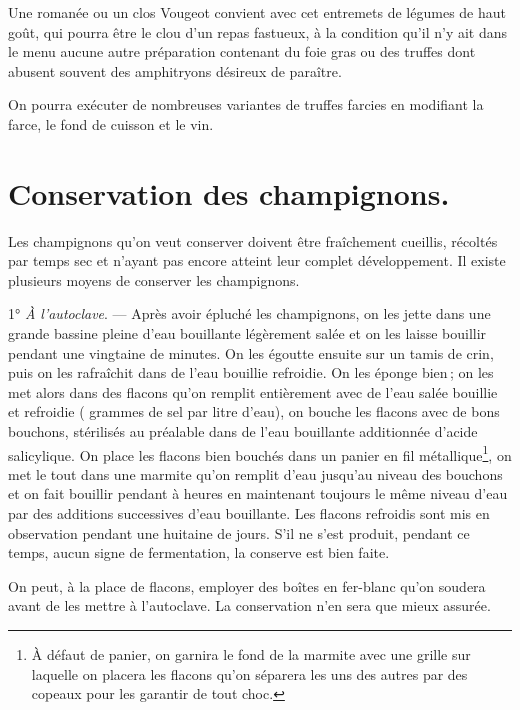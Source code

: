 Une romanée ou un clos Vougeot convient avec cet entremets de légumes de
haut goût, qui pourra être le clou d'un repas fastueux, à la condition qu'il n'y
ait dans le menu aucune autre préparation contenant du foie gras ou des truffes
dont abusent souvent des amphitryons désireux de paraître.

\sk

On pourra exécuter de nombreuses variantes de truffes farcies en modifiant la
farce, le fond de cuisson et le vin.

\section*{\centering Conservation des champignons.}
{}

Les champignons qu'on veut conserver doivent être fraîchement cueillis, récoltés
par temps sec et n'ayant pas encore atteint leur complet développement.
Il existe plusieurs moyens de conserver les champignons.

\medskip

1° \textit{À l'autoclave}. — Après avoir épluché les champignons, on les jette
dans une grande bassine pleine d'eau bouillante légèrement salée et on les
laisse bouillir pendant une vingtaine de minutes. On les égoutte ensuite sur un
tamis de crin, puis on les rafraîchit dans de l’eau bouillie refroidie. On les
éponge bien ; on les met alors dans des flacons qu'on remplit entièrement avec
de l'eau salée bouillie et refroidie ({\mmm} grammes de sel par litre
d'eau), on bouche les flacons avec de bons bouchons, stérilisés au préalable
dans de l’eau bouillante additionnée d'acide salicylique. On place les flacons
bien bouchés dans un panier en fil métallique\footnote{ À défaut de panier, on
garnira le fond de la marmite avec une grille sur laquelle on placera les
flacons qu'on séparera les uns des autres par des copeaux pour les garantir de
tout choc.}, on met le tout dans une marmite qu'on remplit d'eau jusqu'au
niveau des bouchons et on fait bouillir pendant {\mmm} à {\mmm}
heures en maintenant toujours le même niveau d’eau par des additions
successives d'eau bouillante. Les flacons refroidis sont mis en observation
pendant une huitaine de jours. S'il ne s'est produit, pendant ce temps, aucun
signe de fermentation, la conserve est bien faite.

On peut, à la place de flacons, employer des boîtes en fer-blanc qu'on soudera
avant de les mettre à l'autoclave. La conservation n'en sera que mieux assurée.

